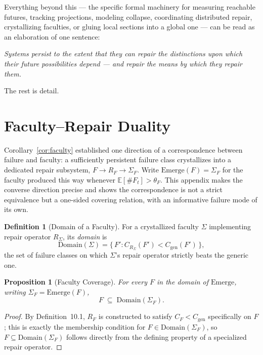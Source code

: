\documentclass[11pt]{article}
\theoremstyle{plain}
\newtheorem{proposition}[theorem]{Proposition}
\theoremstyle{definition}
\newtheorem{definition}[theorem]{Definition}
\theoremstyle{remark}
\begin{document}
Everything beyond this --- the specific formal machinery for measuring reachable futures, tracking projections, modeling collapse, coordinating distributed repair, crystallizing faculties, or gluing local sections into a global one --- can be read as an elaboration of one sentence:

\begin{center}
\emph{Systems persist to the extent that they can repair the distinctions upon which their future possibilities depend --- and repair the means by which they repair them.}
\end{center}

\noindent The rest is detail.

\appendix

\section{Faculty--Repair Duality}
\label{app:duality}

Corollary~\ref{cor:faculty} established one direction of a correspondence between failure and faculty: a sufficiently persistent failure class crystallizes into a dedicated repair subsystem, $F \to R_F \to \Sigma_F$. Write $\mathrm{Emerge}(F) = \Sigma_F$ for the faculty produced this way whenever $\mathbb{E}[\#F_t] > \theta_F$. This appendix makes the converse direction precise and shows the correspondence is not a strict equivalence but a one-sided covering relation, with an informative failure mode of its own.

\begin{definition}[Domain of a Faculty]
For a crystallized faculty $\Sigma$ implementing repair operator $R_\Sigma$, its \emph{domain} is
\[
\mathrm{Domain}(\Sigma) = \{\, F' : C_{R_\Sigma}(F') < C_{\mathrm{gen}}(F') \,\},
\]
the set of failure classes on which $\Sigma$'s repair operator strictly beats the generic one.
\end{definition}

\begin{proposition}[Faculty Coverage]
\label{prop:coverage}
For every $F$ in the domain of $\mathrm{Emerge}$, writing $\Sigma_F = \mathrm{Emerge}(F)$,
\[
F \;\subseteq\; \mathrm{Domain}(\Sigma_F).
\]
\end{proposition}
\begin{proof}
By Definition~10.1, $R_F$ is constructed to satisfy $C_F < C_{\mathrm{gen}}$ specifically on $F$; this is exactly the membership condition for $F \in \mathrm{Domain}(\Sigma_F)$, so $F \subseteq \mathrm{Domain}(\Sigma_F)$ follows directly from the defining property of a specialized repair operator.
\end{proof}
\end{document}
